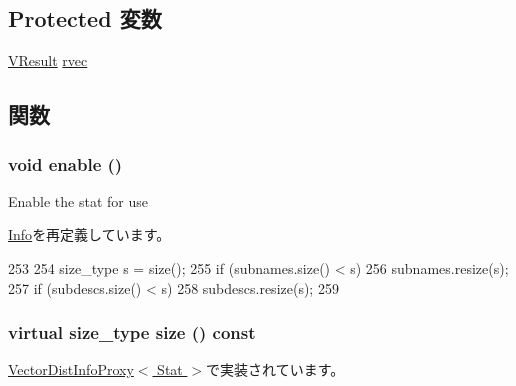 \subsection*{Protected 変数}
\begin{DoxyCompactItemize}
\item 
\hyperlink{classstd_1_1vector}{VResult} \hyperlink{classStats_1_1VectorDistInfo_a39641e85a212191bbc9d5d6293522515}{rvec}
\end{DoxyCompactItemize}


\subsection{関数}
\hypertarget{classStats_1_1VectorDistInfo_a486f22824bd83c5308a0d70ffac6f758}{
\subsubsection[{enable}]{\setlength{\rightskip}{0pt plus 5cm}void enable ()}}
\label{classStats_1_1VectorDistInfo_a486f22824bd83c5308a0d70ffac6f758}
Enable the stat for use 

\hyperlink{classStats_1_1Info_a486f22824bd83c5308a0d70ffac6f758}{Info}を再定義しています。


\begin{DoxyCode}
253 {
254     size_type s = size();
255     if (subnames.size() < s)
256         subnames.resize(s);
257     if (subdescs.size() < s)
258         subdescs.resize(s);
259 }
\end{DoxyCode}
\hypertarget{classStats_1_1VectorDistInfo_a4051d143efd31726fa13df03ae4e1bce}{
\subsubsection[{size}]{\setlength{\rightskip}{0pt plus 5cm}virtual {\bf size\_\-type} size () const}}
\label{classStats_1_1VectorDistInfo_a4051d143efd31726fa13df03ae4e1bce}


\hyperlink{classStats_1_1VectorDistInfoProxy_a503ab01f6c0142145d3434f6924714e7}{VectorDistInfoProxy$<$ Stat $>$}で実装されています。

